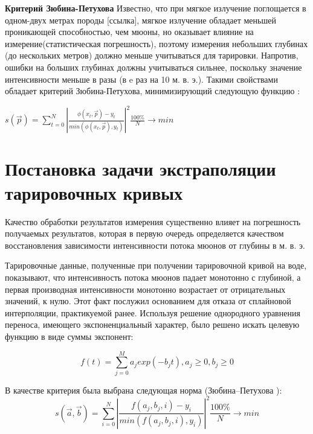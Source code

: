 \textbf{Критерий Зюбина-Петухова}
Известно, что при мягкое излучение поглощается в одном-двух метрах породы [ссылка], мягкое излучение обладает
меньшей проникающей способностью, чем мюоны, но оказывает влияние на измерение(статистическая погрешность),
поэтому измерения небольших глубинах (до нескольких метров) должно меньше учитываться для тарировки. 
Напротив, ошибки на больших глубинах должны учитываться сильнее, поскольку значение интенсивности  меньше в разы
(в e раз на 10 м. в. э.). Такими свойствами обладает критерий Зюбина-Петухова, минимизирующий следующую функцию : 

\begin{center}
$s(\vec{p}) = \displaystyle\sum_{t=0}^N \left|
\frac{\phi(x_t, \vec{p}) - y_t}{min(\phi(x_t, \vec{p}), y_t)}\right|^2 
\frac{100\%}{N} \rightarrow min$ %
 
\end{center}


\section{Постановка задачи экстраполяции тарировочных кривых}\label{sect2_2}

Качество обработки результатов измерения существенно влияет на погрешность
получаемых результатов, которая в первую очередь определяется
качеством восстановления зависимости интенсивности потока мюонов от глубины в м. в. э.

Тарировочные данные, полученные при получении тарировочной кривой на воде, 
показывают, что интенсивность потока мюонов падает монотонно с
глубиной, а первая производная интенсивности монотонно возрастает 
от отрицательных значений, к нулю. Этот факт послужил основанием для отказа 
от сплайновой интерполяции, практикуемой ранее. Используя решение 
однородного уравнения переноса, имеющего экспоненциальный характер, было решено
искать целевую функцию в виде суммы экспонент:

\begin{equation}
  \label{eq:approximation}
  \mathit{ f(t)  = \displaystyle\sum_{j=0}^M a_j exp(-b_j t) , a_j \geq 0 , b_j \geq 0  }  
\end{equation}




В качестве критерия была выбрана следующая норма (Зюбина--Петухова ): 
\begin{equation}
	\label{eq:zuybin_petuhov}
	s(\vec{a}, \vec{b}) = \displaystyle\sum_{i=0}^N \left|
	\frac{f(a_j, b_j, i) - y_i}{min(f(a_j, b_j, i), y_i)}\right|^2 
	\frac{100\%}{N} \rightarrow min %
\end{equation}

